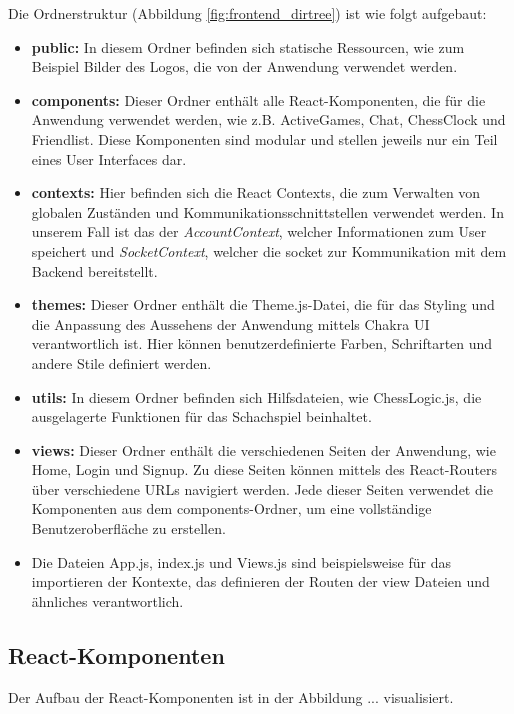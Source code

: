 \documentclass[a4paper,12pt]{report}
\begin{document}
Die Ordnerstruktur (Abbildung \ref{fig:frontend_dirtree}) ist wie folgt aufgebaut:
\begin{itemize}
\item \textbf{public:} In diesem Ordner befinden sich statische Ressourcen, wie zum Beispiel Bilder des Logos, die von der Anwendung verwendet werden.
\item \textbf{components:} Dieser Ordner enthält alle React-Komponenten, die für die Anwendung verwendet werden, wie z.B. ActiveGames, Chat, ChessClock und Friendlist. Diese Komponenten sind modular und stellen jeweils nur ein Teil eines User Interfaces dar.
\item \textbf{contexts:} Hier befinden sich die React Contexts, die zum Verwalten von globalen Zuständen und Kommunikationsschnittstellen verwendet werden. In unserem Fall ist das der \textit{AccountContext}, welcher Informationen zum User speichert und \textit{SocketContext}, welcher die socket zur Kommunikation mit dem Backend bereitstellt.
\item \textbf{themes:} Dieser Ordner enthält die Theme.js-Datei, die für das Styling und die Anpassung des Aussehens der Anwendung mittels Chakra UI verantwortlich ist. Hier können benutzerdefinierte Farben, Schriftarten und andere Stile definiert werden.
\item \textbf{utils:} In diesem Ordner befinden sich Hilfsdateien, wie ChessLogic.js, die ausgelagerte Funktionen für das Schachspiel beinhaltet.
\item \textbf{views:} Dieser Ordner enthält die verschiedenen Seiten der Anwendung, wie Home, Login und Signup. Zu diese Seiten können mittels des React-Routers über verschiedene URLs navigiert werden. Jede dieser Seiten verwendet die Komponenten aus dem components-Ordner, um eine vollständige Benutzeroberfläche zu erstellen.
\item Die Dateien App.js, index.js und Views.js sind beispielsweise für das importieren der Kontexte, das definieren der Routen der view Dateien und ähnliches verantwortlich.
\end{itemize}
    
        \subsection{React-Komponenten}
Der Aufbau der React-Komponenten ist in der Abbildung ... visualisiert. 
    
\usetikzlibrary{positioning}
    
\end{document}
